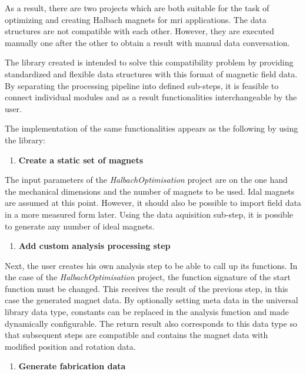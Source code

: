 As a result, there are two projects which are both suitable for the task
of optimizing and creating Halbach magnets for \gls{mri} applications.
The data structures are not compatible with each other. However, they
are executed manually one after the other to obtain a result with manual
data conversation.

The library created is intended to solve this compatibility problem by
providing standardized and flexible data structures with this format of
magnetic field data. By separating the processing pipeline into defined
sub-steps, it is feasible to connect individual modules and as a result
functionalities interchangeable by the user.

The implementation of the same functionalities appears as the following
by using the library:

\begin{enumerate}
\def\labelenumi{\arabic{enumi}.}
\tightlist
\item
  \textbf{Create a static set of magnets}
\end{enumerate}

The input parameters of the \emph{HalbachOptimisation} 
project are on the one hand the mechanical dimensions and the number of
magnets to be used. Idal magnets are assumed at this point. However, it
should also be possible to import field data in a more measured form
later. Using the data aquisition sub-step, it is possible to generate
any number of ideal magnets.

\begin{enumerate}
\def\labelenumi{\arabic{enumi}.}
\setcounter{enumi}{1}
\tightlist
\item
  \textbf{Add custom analysis processing step}
\end{enumerate}

Next, the user creates his own analysis step to be able to call up its
functions. In the case of the \emph{HalbachOptimisation} 
project, the function signature of the start function must be changed.
This receives the result of the previous step, in this case the
generated magnet data. By optionally setting meta data in the universal
library data type, constants can be replaced in the analysis function
and made dynamically configurable. The return result also corresponds to
this data type so that subsequent steps are compatible and contains the
magnet data with modified position and rotation data.

\begin{enumerate}
\def\labelenumi{\arabic{enumi}.}
\setcounter{enumi}{2}
\tightlist
\item
  \textbf{Generate fabrication data}
\end{enumerate}

